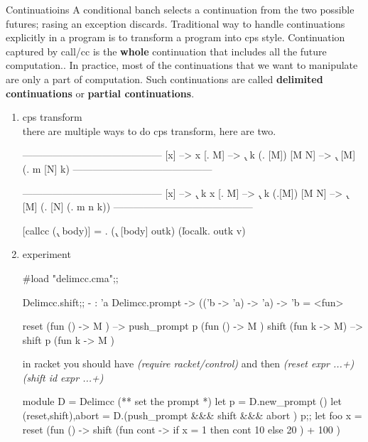 Continuatioins
A conditional banch selects a continuation from the two possible
futures; rasing an exception discards. Traditional way to handle
continuations explicitly in a program is to transform a program into
cps style. Continuation captured by call/cc is the {\bf whole} continuation
that includes all the future computation.. In practice, most of the
continuations that we want to manipulate are only a part of
computation. Such continuations are called {\bf delimited continuations} or
{\bf partial continuations}.


\begin{enumerate}
\item cps transform \\
  there are multiple ways to do cps transform, here are two.

  
  \begin{bluetext}
------------------------------------------
   [x] --> x
   [\x. M] --> \k . k (\x . [M])
   [M N] --> \k. [M] (\m . m [N] k)
------------------------------------------


------------------------------------------
   [x] --> \k . k x
   [\x. M] --> \k. k (\x.[M])
   [M N] --> \k. [M] (\m . [N] (\n. m n k))
------------------------------------------


[callcc (\k. body)] = \outk. (\k. [body] outk) (\v localk. outk v)
   
  \end{bluetext}

  
\item experiment

\begin{alternate}
#load "delimcc.cma";;
\end{alternate}
\begin{alternate}
Delimcc.shift;;
- : 'a Delimcc.prompt -> (('b -> 'a) -> 'a) -> 'b = <fun>
\end{alternate}

\begin{bluetext}
reset (fun () -> M ) --> push_prompt p (fun () -> M )
shift (fun k -> M) --> shift p (fun k -> M )
\end{bluetext}
in racket you should have \textit{(require racket/control)}
and then \textit{(reset expr ...+)}
\textit{(shift id expr ...+)}


\begin{redcode}
module D = Delimcc
(** set the prompt *)  
let p = D.new_prompt ()
let (reset,shift),abort  = D.(push_prompt &&& shift &&& abort ) p;;
let foo x = reset (fun () -> shift (fun cont -> if x = 1 then cont 10 else 20 ) + 100 )
\end{redcode}


\end{enumerate}
